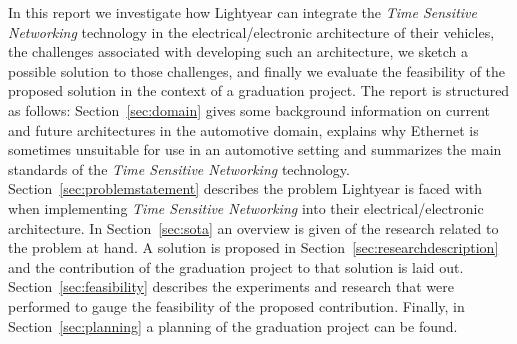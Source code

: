 In this report we investigate how Lightyear can integrate the \textit{Time Sensitive Networking} technology in the electrical/electronic architecture of their vehicles, the challenges associated with developing such an architecture, we sketch a possible solution to those challenges, and finally we evaluate the feasibility of the proposed solution in the context of a graduation project. The report is structured as follows: Section~\ref{sec:domain} gives some background information on current and future architectures in the automotive domain, explains why Ethernet is sometimes unsuitable for use in an automotive setting and summarizes the main standards of the \textit{Time Sensitive Networking} technology. Section~\ref{sec:problemstatement} describes the problem Lightyear is faced with when implementing \textit{Time Sensitive Networking} into their electrical/electronic architecture. In Section~\ref{sec:sota} an overview is given of the research related to the problem at hand. A solution is proposed in Section~\ref{sec:researchdescription} and the contribution of the graduation project to that solution is laid out. Section~\ref{sec:feasibility} describes the experiments and research that were performed to gauge the feasibility of the proposed contribution. Finally, in Section~\ref{sec:planning} a planning of the graduation project can be found.
